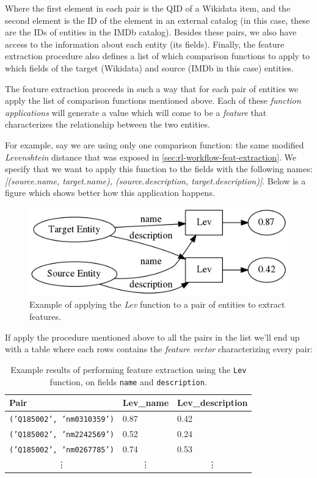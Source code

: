 \documentclass[epsfig,a4paper,11pt,titlepage,twoside,openany]{book}
\begin{document}
Where the first element in each pair is the QID of a Wikidata item, and the second element is the ID of the element in an external catalog (in this case, these are the IDs of entities in the IMDb catalog). Besides these pairs, we also have access to the information about each entity (its fields). Finally, the feature extraction procedure also defines a list of which comparison functions to apply to which fields of the target (Wikidata) and source (IMDb in this case) entities.

The feature extraction proceeds in such a way that for each pair of entities we apply the list of comparison functions mentioned above. Each of these \textit{function applications} will generate a value which will come to be a \textit{feature} that characterizes the relationship between the two entities.

For example, say we are using only one comparison function: the same modified \textit{Levenshtein} distance that was exposed in \autoref{sec:rl-workflow-feat-extraction}. We specify that we want to apply this function to the fields with the following names: \textit{[(source.name, target.name), (source.description, target.description)]}. Below is a figure which shows better how this application happens.

\begin{figure}[H]
  \centering \includegraphics[width=.6\textwidth]{feature_extraction}
  \caption{Example of applying the \textit{Lev} function to a pair of entities to extract features.}
  \label{fig:feature-extractions-flow-ex}
\end{figure}

If apply the procedure mentioned above to all the pairs in the list we'll end up with a table where each rows contains the \textit{feature vector} characterizing every pair:

\begin{table}[H]
\centering
\begin{tabular}{l|l|l}
Pair                     & Lev\_name             & Lev\_description      \\ \hline
\texttt{('Q185002', 'nm0310359')} & 0.87                  & 0.42                  \\
\texttt{('Q185002', 'nm2242569')} & 0.52                  & 0.24                  \\
\texttt{('Q185002', 'nm0267785')} & 0.74                  & 0.53                  \\
\multicolumn{1}{c}{\vdots}    & \multicolumn{1}{c}{\vdots}  & \multicolumn{1}{c}{\vdots}  
\end{tabular}
\caption{Example results of performing feature extraction using the \texttt{Lev} function, on fields \texttt{name} and \texttt{description}.}
\label{tab:soweego-feature-extraction-example-results}
\end{table}
\end{document}
